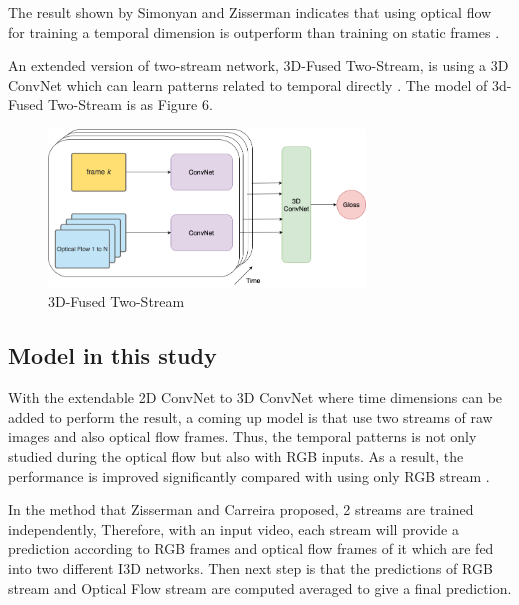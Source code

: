 \documentclass[a4paper, 12pt]{article}
\begin{document}
The result shown by Simonyan and Zisserman indicates that using optical flow for training a temporal dimension is outperform than training on static frames \citep{karpathy2014large}.

An extended version of two-stream network, 3D-Fused Two-Stream, is using a 3D ConvNet which can learn patterns related to temporal directly \citep{carreira2017quo}. The model of 3d-Fused Two-Stream is as Figure 6.

\begin{figure}[H]
    \centering
    \includegraphics[width=0.75\textwidth]{3D-Fused Two-stream.png}
    \caption{3D-Fused Two-Stream}
    \label{Figure}
\end{figure}

\subsection{Model in this study}
With the extendable 2D ConvNet to 3D ConvNet where time dimensions can be added to perform the result, a coming up model is that use two streams of raw images and also optical flow frames. Thus, the temporal patterns is not only studied during the optical flow but also with RGB inputs. As a result, the performance is improved significantly compared with using only RGB stream \citep{carreira2017quo}.

In the method that Zisserman and Carreira proposed, 2 streams are trained independently, Therefore, with an input video, each stream will provide a prediction according to RGB frames and optical flow frames of it which are fed into two different I3D networks. Then next step is that the predictions of RGB stream and Optical Flow stream are computed averaged to give a final prediction.
\end{document}
